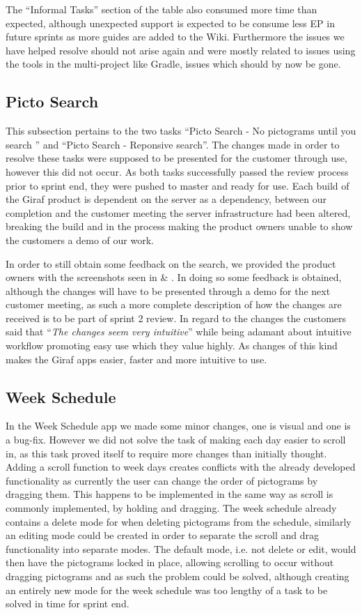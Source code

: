The ``Informal Tasks'' section of the table also consumed more time than expected, although unexpected support is expected to be consume less EP in future sprints as more guides are added to the Wiki.
Furthermore the issues we have helped resolve should not arise again and were mostly related to issues using the tools in the multi-project like Gradle, issues which should by now be gone.

\subsection{Picto Search}
This subsection pertains to the two tasks ``Picto Search - No pictograms until you search '' and ``Picto Search - Reponsive search''.
The changes made in order to resolve these tasks were supposed to be presented for the customer through use, however this did not occur.
As both tasks successfully passed the review process prior to sprint end, they were pushed to master and ready for use.
Each build of the Giraf product is dependent on the server as a dependency, between our completion and the customer meeting the server infrastructure had been altered, breaking the build and in the process making the product owners unable to show the customers a demo of our work.

In order to still obtain some feedback on the search, we provided the product owners with the screenshots seen in  \& .
In doing so some feedback is obtained, although the changes will have to be presented through a demo for the next customer meeting, as such a more complete description of how the changes are received is to be part of sprint 2 review.   
In regard to the changes the customers said that ``\textit{The changes seem very intuitive}'' while being adamant about intuitive workflow promoting easy use which they value highly.
As changes of this kind makes the Giraf apps easier, faster and more intuitive to use.

\subsection{Week Schedule}
In the Week Schedule app we made some minor changes, one is visual and one is a bug-fix. 
However we did not solve the task of making each day easier to scroll in, as this task proved itself to require more changes than initially thought.
Adding a scroll function to week days creates conflicts with the already developed functionality as currently the user can change the order of pictograms by dragging them.
This happens to be implemented in the same way as scroll is commonly implemented, by holding and dragging.
The week schedule already contains a delete mode for when deleting pictograms from the schedule, similarly an editing mode could be created in order to separate the scroll and drag functionality into separate modes.
The default mode, i.e. not delete or edit, would then have the pictograms locked in place, allowing scrolling to occur without dragging pictograms and as such the problem could be solved, although creating an entirely new mode for the week schedule was too lengthy of a task to be solved in time for sprint end.